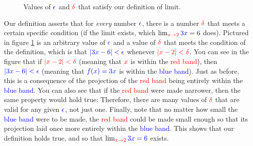 \documentclass{myarticle}
\newcommand{\hor}[1]{\textcolor{red}{#1}}
\newcommand{\ver}[1]{\textcolor{blue}{#1}}
\newcommand{\olive}[1]{\textcolor{green!50!red}{#1}}
\theoremstyle{nospace}
\newtheorem{old series theorem}{Theorem}
\newenvironment{series theorem}
{\begin{mdframed}\begin{old series theorem}}
    {\end{old series theorem}\end{mdframed}}
\begin{document}
\begin{figure}[htb!] \centering
  \caption{Values of $\ver{\epsilon}$ and $\hor{\delta}$ that satisfy
    our definition of limit.}
  \label{fig:linear ed}
\end{figure}

Our definition asserts that for \emph{every} number $\ver{\epsilon}$,
there is a number $\hor{\delta}$ that meets a certain specific
condition (if the limit exists, which
$\lim_{\hor{x \to 2}} \ver{3x} = \ver{6}$ does). Pictured in figure
\ref{fig:linear ed} is an arbitrary value of $\ver{\epsilon}$ and a
value of $\hor{\delta}$ that meets the condition of the definition,
which is that $\ver{|3x - 6| < \epsilon}$ whenever
$\hor{|x - 2| < \delta}$. You can see in the figure that if
$\hor{|x - 2| < \delta}$ (meaning that $\hor{x}$ is within the
\hor{red band}), then $\ver{|3x - 6| < \epsilon}$ (meaning that
$\ver{f(x) = 3x}$ is within the \ver{blue band}). Just as before, this
is a consequence of the \olive{projection} of the \hor{red band} being
entirely within the \ver{blue band}. You can also see that if the
\hor{red band} were made narrower, then the same property would hold
true: Therefore, there are many values of $\hor{\delta}$ that are
valid for any given $\ver{\epsilon}$, not just one. Finally, note that
no matter how small the \ver{blue band} were to be made, the \hor{red
  band} could be made small enough so that its \olive{projection} laid
once more entirely within the \ver{blue band}. This shows that our
definition holds true, and so that
$\lim_{\hor{x \to 2}} \ver{3x} = \ver{6}$ exists.
\end{document}
